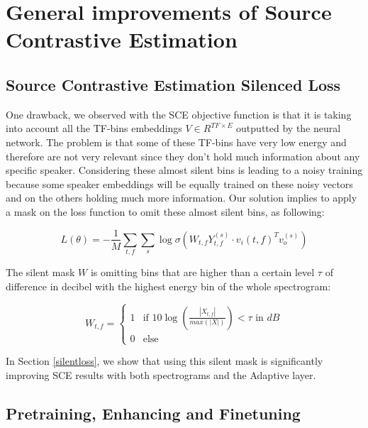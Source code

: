 \documentclass[master, tikz, final,11pt, dvipdfmx]{iscs-thesis}
\begin{document}
\section{General improvements of Source Contrastive Estimation}

\subsection{Source Contrastive Estimation Silenced Loss}

One drawback, we observed with the SCE objective function is that it is taking into account all the TF-bins embeddings $V \in R^{TF\times E}$ outputted by the neural network. The problem is that some of these TF-bins have very low energy and therefore are not very relevant since they don't hold much information about any specific speaker. Considering these almost silent bins is leading to a noisy training because some speaker embeddings will be equally trained on these noisy vectors and on the others holding much more information. Our solution implies to apply a mask on the loss function to omit these almost silent bins, as following:

\[L(\theta) = - \frac{1}{M} \sum_{t,f} \sum_{s} \log \sigma(W_{t,f}Y_{t,f}^{(s)}  \cdot v_i(t,f)^{T} v_o^{(s)})\]

The silent mask $W$ is omitting bins that are higher than a certain level $\tau$ of difference in decibel with the highest energy bin of the whole spectrogram:

$$
W_{t,f} =  \left\{
    \begin{array}{ll}
        1 & \mbox{if } 10\log (\frac{|X_{t,f}|}{max(|X|)}) < \tau \mbox{ in } dB  \\
        0 & \mbox{else}
    \end{array}
\right.
$$

In Section \ref{silentloss}, we show that using this silent mask is significantly improving SCE results with both spectrograms and the Adaptive layer.

\subsection{Pretraining, Enhancing and Finetuning}
\end{document}
